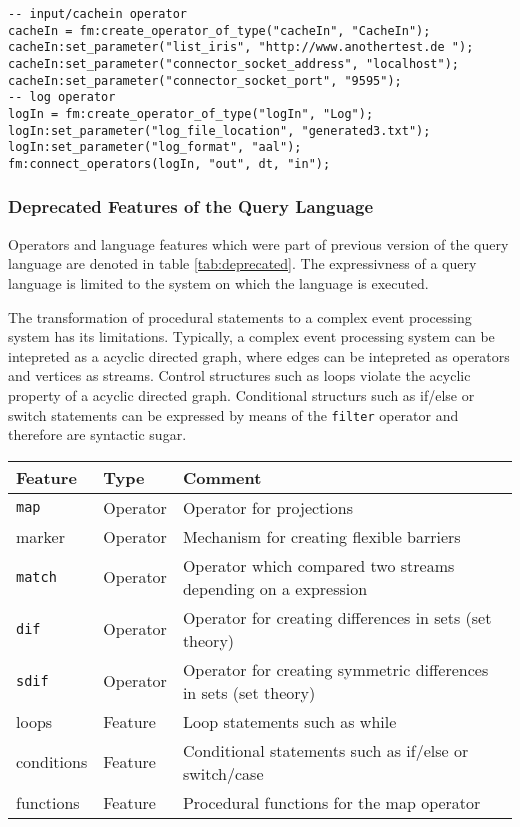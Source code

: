 \begin{lstlisting}[language=Flow, caption={\emph{Generated LUA code of system operators}},label={lst:exanlua}]
-- input/cachein operator
cacheIn = fm:create_operator_of_type("cacheIn", "CacheIn");
cacheIn:set_parameter("list_iris", "http://www.anothertest.de ");
cacheIn:set_parameter("connector_socket_address", "localhost");
cacheIn:set_parameter("connector_socket_port", "9595");
-- log operator
logIn = fm:create_operator_of_type("logIn", "Log");
logIn:set_parameter("log_file_location", "generated3.txt");
logIn:set_parameter("log_format", "aal");
fm:connect_operators(logIn, "out", dt, "in");
\end{lstlisting}

\subsubsection{Deprecated Features of the Query Language}
Operators and language features which were part of previous version of the query
language are denoted in table \ref{tab:deprecated}. The expressivness of a query
language is limited to the system on which the language is executed.

The transformation of procedural statements to a complex event processing system
has its limitations. Typically, a complex event processing system can be 
intepreted as a acyclic directed graph, where edges can be intepreted as 
operators and vertices as streams. Control structures such as loops violate the
acyclic property of a acyclic directed graph. Conditional structurs such as 
if/else or switch statements can be expressed by means of the \texttt{filter}
operator and therefore are syntactic sugar. 
\begin{center}
  \begin{tabular}{|l|l|l|}
  \hline
  \textbf{Feature} & \textbf{Type} & \textbf{Comment} \\
  \hline
  \hline
  \texttt{map} & Operator & Operator for projections \\
  \hline
  marker & Operator & Mechanism for creating flexible barriers \\
  \hline
  \texttt{match} & Operator & Operator which compared two streams depending on a expression \\
  \hline
  \texttt{dif} & Operator & Operator for creating differences in sets (set theory) \\
  \hline
  \texttt{sdif} & Operator & Operator for creating symmetric differences in sets (set theory) \\
  \hline
  loops & Feature & Loop statements such as while  \\
  \hline
  conditions & Feature & Conditional statements such as if/else or switch/case \\
  \hline
  functions & Feature & Procedural functions for the map operator \\
  \hline
  \end{tabular}
  \label{tab:deprecated}
\end{center}

